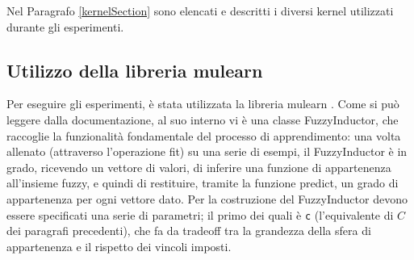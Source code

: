 \documentclass[12pt,a4paper]{report}
\begin{document}
Nel Paragrafo \ref{kernelSection} sono elencati e descritti i diversi kernel utilizzati durante gli esperimenti.

\subsection{Utilizzo della libreria mulearn}\label{FuzzifierSection}

Per eseguire gli esperimenti, è stata utilizzata la libreria mulearn \cite{mulearn}.
Come si può leggere dalla documentazione, al suo interno vi è una classe FuzzyInductor, che raccoglie la funzionalità fondamentale del processo di apprendimento: una volta allenato (attraverso l'operazione fit) su una serie di esempi, il FuzzyInductor è in grado, ricevendo un vettore di valori, di inferire una funzione di appartenenza all'insieme fuzzy, e quindi di restituire, tramite la funzione predict, un grado di appartenenza per ogni vettore dato.
Per la costruzione del FuzzyInductor devono essere specificati una serie di parametri; il primo dei quali è \texttt{c} (l'equivalente di $C$ dei paragrafi precedenti), che fa da tradeoff tra la grandezza della sfera di appartenenza e il rispetto dei vincoli imposti. 
\end{document}
